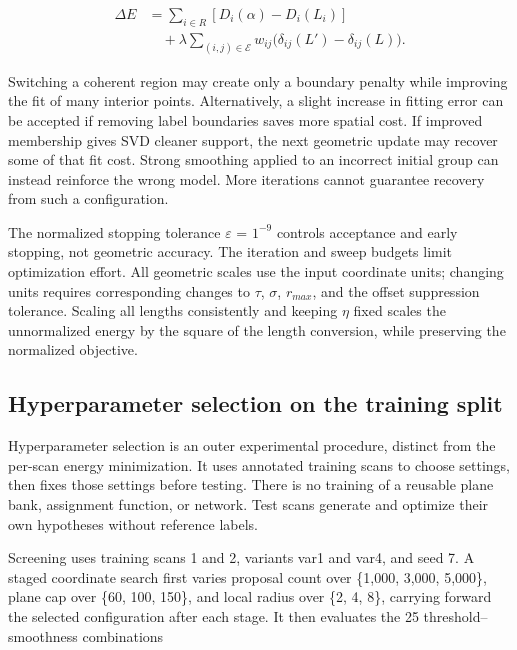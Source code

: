 \begin{equation}
\begin{aligned}\Delta E&=\sum_{i\in R}[D_i(\alpha)-D_i(L_i)]\\&\quad+\lambda\sum_{(i,j)\in\mathcal E}w_{ij}\bigl(\delta_{ij}(L')-\delta_{ij}(L)\bigr).\end{aligned}
\label{eq:39}
\end{equation}

Switching a coherent region may create only a boundary penalty while improving the fit of many interior points. Alternatively, a slight increase in fitting error can be accepted if removing label boundaries saves more spatial cost. If improved membership gives SVD cleaner support, the next geometric update may recover some of that fit cost. Strong smoothing applied to an incorrect initial group can instead reinforce the wrong model. More iterations cannot guarantee recovery from such a configuration.

The normalized stopping tolerance \(\varepsilon\) = \(1^{-9}\) controls acceptance and early stopping, not geometric accuracy. The iteration and sweep budgets limit optimization effort. All geometric scales use the input coordinate units; changing units requires corresponding changes to \(\tau\), \(\sigma\), \(r_{max}\), and the offset suppression tolerance. Scaling all lengths consistently and keeping \(\eta\) fixed scales the unnormalized energy by the square of the length conversion, while preserving the normalized objective.

\subsection{Hyperparameter selection on the training split}\label{hyperparameter-selection-on-the-training-split}

Hyperparameter selection is an outer experimental procedure, distinct from the per-scan energy minimization. It uses annotated training scans to choose settings, then fixes those settings before testing. There is no training of a reusable plane bank, assignment function, or network. Test scans generate and optimize their own hypotheses without reference labels.

Screening uses training scans 1 and 2, variants var1 and var4, and seed 7. A staged coordinate search first varies proposal count over \{1,000, 3,000, 5,000\}, plane cap over \{60, 100, 150\}, and local radius over \{2, 4, 8\}, carrying forward the selected configuration after each stage. It then evaluates the 25 threshold--smoothness combinations

